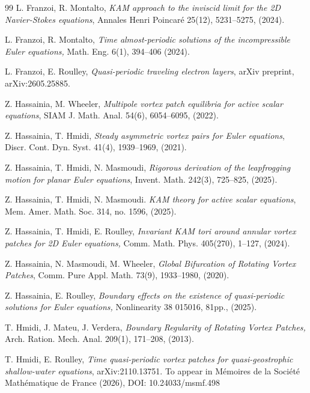 \documentclass[a4paper,reqno,10pt]{article}
\begin{document}
\begin{thebibliography}{99}
	L. Franzoi, R. Montalto,
	{\it KAM approach to the inviscid limit for the 2D Navier-Stokes equations},
	Annales Henri Poincar\'e 25(12), 5231--5275, (2024).	

    L. Franzoi, R. Montalto, 
    \textit{Time almost-periodic solutions of the incompressible Euler equations,} 
    Math. Eng. 6(1), 394--406  (2024).

    L. Franzoi, E. Roulley,
    \textit{Quasi-periodic traveling electron layers},
    arXiv preprint,	arXiv:2605.25885.
   
    Z. Hassainia, M. Wheeler, 
    {\it Multipole vortex patch equilibria for active scalar equations},  SIAM J.  Math. Anal.  54(6), 6054--6095, (2022).


    
    Z. Hassainia, T. Hmidi, 
    {\it Steady asymmetric vortex pairs for Euler equations},
    Discr. Cont. Dyn. Syst. 41(4), 1939--1969, (2021).

Z. Hassainia, T. Hmidi, N. Masmoudi,
 \textit{Rigorous derivation of the leapfrogging motion for planar Euler equations},
 Invent. Math. 242(3), 725--825, (2025).


    Z. Hassainia, T. Hmidi, N. Masmoudi.
 \textit{KAM theory for active scalar equations}, 
 Mem. Amer. Math. Soc. 314, no. 1596, (2025).

 Z. Hassainia, T. Hmidi, E. Roulley, 
 \textit{Invariant KAM tori around annular vortex patches for 2D Euler equations,}
 Comm. Math. Phys. 405(270), 1--127, (2024).

Z. Hassainia, N. Masmoudi, M. Wheeler,
 \textit{Global Bifurcation of Rotating Vortex Patches},
 Comm. Pure Appl. Math. 73(9), 1933--1980, (2020).

Z. Hassainia, E. Roulley, 
\textit{Boundary effects on the existence of quasi-periodic solutions for Euler equations,} 
Nonlinearity 38 015016, 81pp., (2025).
 
 T. Hmidi, J. Mateu, J. Verdera,
 \textit{Boundary Regularity of Rotating Vortex Patches,} 
 Arch. Ration. Mech. Anal.
209(1), 171--208, (2013).


	T. Hmidi, E. Roulley,
	{\it Time quasi-periodic vortex patches for quasi-geostrophic shallow-water equations}, arXiv:2110.13751.
	To appear in M\'emoires de la Soci\'et\'e Math\'ematique de France (2026),  DOI: 10.24033/msmf.498


\end{thebibliography}
\end{document}
